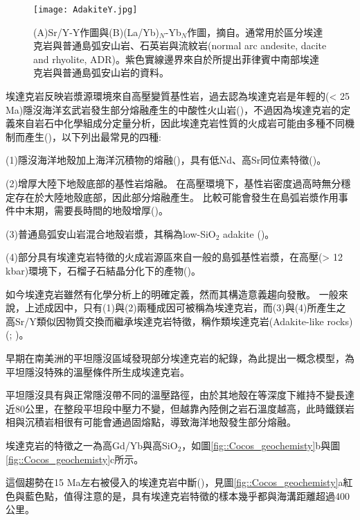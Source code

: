 \begin{figure*}[h]
    \centering
    \texttt{[image: AdakiteY.jpg]}
    \caption[Sr/Y-Y作圖與(La/Yb)$_N$-Yb$_N$作圖]{(A)Sr/Y-Y作圖與(B)(La/Yb)$_N$-Yb$_N$作圖，摘自\citealp{castillo2012adakite}。通常用於區分埃達克岩與普通島弧安山岩、石英岩與流紋岩(normal arc andesite, dacite and rhyolite, ADR)。紫色實線邊界來自於\citealp{richards2007special}所提出菲律賓中南部埃達克岩與普通島弧安山岩的資料。}
    \label{fig::AdakiteY}
\end{figure*}

埃達克岩反映岩漿源環境來自高壓變質基性岩，過去認為埃達克岩是年輕的(< 25 Ma)隱沒海洋玄武岩發生部分熔融產生的中酸性火山岩(\citealp{defant1990derivation})，不過因為埃達克岩的定義來自岩石中化學組成分定量分析，因此埃達克岩性質的火成岩可能由多種不同機制而產生(\citealp{martin2005overview})，以下列出最常見的四種:

(1)隱沒海洋地殼加上海洋沉積物的熔融(\citealp{defant1990derivation})，具有低Nd、高Sr同位素特徵(\citealp{gomez2003temporal})。

(2)增厚大陸下地殼底部的基性岩熔融。
在高壓環境下，基性岩密度過高時無分穩定存在於大陸地殼底部，因此部分熔融產生。
比較可能會發生在島弧岩漿作用事件中末期，需要長時間的地殼增厚(\citealp{kay2002magmatism})。

(3)普通島弧安山岩混合地殼岩漿，其稱為low-SiO$_2$ adakite (\citealp{martin2005overview})。

(4)部分具有埃達克岩特徵的火成岩源區來自一般的島弧基性岩漿，在高壓(> 12 kbar)環境下，石榴子石結晶分化下的產物(\citealp{moyen2009high})。

如今埃達克岩雖然有化學分析上的明確定義，然而其構造意義趨向發散。
一般來說，上述成因中，只有(1)與(2)兩種成因可被稱為埃達克岩，而(3)與(4)所產生之高Sr/Y類似因物質交換而繼承埃達克岩特徵，稱作類埃達克岩(Adakite-like rocks)(\citealp{kay2002magmatism}; \citealp{goss2013andean})。

早期在南美洲的平坦隱沒區域發現部分埃達克岩的紀錄，\citealp{Gutscher2000Bcan}為此提出一概念模型，為平坦隱沒特殊的溫壓條件所生成埃達克岩。

平坦隱沒具有與正常隱沒帶不同的溫壓路徑，由於其地殼在等深度下維持不變長達近80公里，在整段平坦段中壓力不變，但越靠內陸側之岩石溫度越高，此時鐵鎂岩相與沉積岩相很有可能會通過固熔點，導致海洋地殼發生部分熔融。


埃達克岩的特徵之一為高Gd/Yb與高SiO$_2$，如圖\ref{fig::Cocos_geochemisty}b與圖\ref{fig::Cocos_geochemisty}c所示。

這個趨勢在15 Ma左右被侵入的埃達克岩中斷(\citealp{mori2007effects})，見圖\ref{fig::Cocos_geochemisty}a紅色與藍色點，值得注意的是，具有埃達克岩特徵的樣本幾乎都與海溝距離超過400公里。

